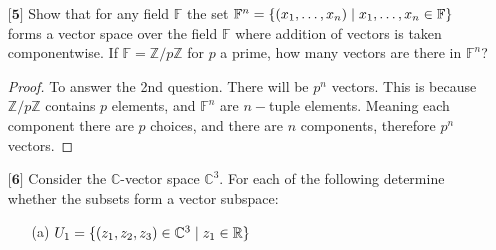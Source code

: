 \documentclass[12pt]{article}
\newcommand      {\Zm}         {{\mathbb Z}}
\newcommand      {\Rm}         {{\mathbb R}}
\newcommand      {\Fm}         {{\mathbb F}}
\begin{document}
\begin{itemize}
\begin{itemize}
\begin{proof}
        In this case those the coeffectients done for the imaginary componenet are is simply the 2nd comonponent in $\Rm^2$ and the real component of the the complex number lines up with the first comonponent of $\Rm^2$.

        We know $\Rm^2 = \Rm \times  \Rm$, we also know $\Rm$ is an abelian group under addition by definition of being a field. We know from group theory that the direct product of 2 abelian groups is also an abelian group. Therefore $\Rm^2$ under this defintion of addition and multiplication is indeed a field, more specifically the only way to make $\Rm^2$ into a field. 

    \end{proof}
    
    \end{itemize}
    
    \vspace{.5cm}
    
    \item[$\textbf{[5]}$]%
    Show that for any field $\mathbb{F}$ the set $\mathbb{F}^n = \{ (x_1,\dots,x_n) \hspace{.1cm} | \hspace{.1cm} x_1,\dots,x_n \in \mathbb{F} \}$ forms a vector space over the field $\mathbb{F}$ where addition of vectors is taken componentwise. If $\mathbb{F} = \mathbb{Z}/p\mathbb{Z}$ for $p$ a prime, how many vectors are there in $\mathbb{F}^n$?

    \begin{proof}
        To answer the 2nd question. There will be $p^n$ vectors. This is because $\Zm/p\Zm$ contains $p$ elements, and $\Fm^n$ are $n-$tuple elements. Meaning each component there are $p$ choices, and there are $n$ components, therefore $p^n$ vectors. 
    \end{proof}
    
    \newpage
    
    
    \item[$\textbf{[6]}$]%
    Consider the $\mathbb{C}$-vector space $\mathbb{C}^3$. For each of the following determine whether the subsets form a vector subspace:
    \begin{itemize}
    
    \vspace{.3cm}
    \item[(a)]
    $U_1 = \{ (z_1,z_2,z_3) \in \mathbb{C}^3 \hspace{.1cm} | \hspace{.1cm} z_1 \in \mathbb{R} \}$
    

\end{itemize}
\end{itemize}
\end{document}
